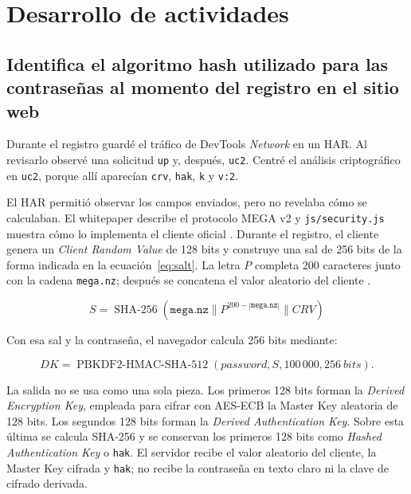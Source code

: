 \documentclass[letterpaper,12pt]{article}
\begin{document}
\section{Desarrollo de actividades}

\subsection{Identifica el algoritmo hash utilizado para las contraseñas al momento del registro en el sitio web}

Durante el registro guardé el tráfico de DevTools \textit{Network} en un HAR. Al revisarlo
observé una solicitud \texttt{up} y, después, \texttt{uc2}. Centré el análisis criptográfico
en \texttt{uc2}, porque allí aparecían \texttt{crv}, \texttt{hak}, \texttt{k} y
\texttt{v:2}.

El HAR permitió observar los campos enviados, pero no revelaba cómo se calculaban. El
whitepaper describe el protocolo MEGA v2 y \texttt{js/security.js} muestra cómo lo implementa
el cliente oficial \cite[págs.~16 a 17]{mega-whitepaper}\cite{mega-security-js}. Durante el
registro, el cliente genera un
\textit{Client Random Value} de 128 bits y construye una sal de 256 bits de la forma indicada
en la ecuación~\ref{eq:salt}. La letra \(P\) completa 200 caracteres junto con la cadena
\texttt{mega.nz}; después se concatena el valor aleatorio del cliente
\cite[págs.~16 a 17]{mega-whitepaper}.

\begin{equation}
\label{eq:salt}
S = \operatorname{SHA\mbox{-}256}
\left(\texttt{mega.nz} \parallel P^{200-|\texttt{mega.nz}|} \parallel CRV\right)
\end{equation}

Con esa sal y la contraseña, el navegador calcula 256 bits mediante:

\begin{equation}
DK = \operatorname{PBKDF2\mbox{-}HMAC\mbox{-}SHA\mbox{-}512}
(\textit{password}, S, 100\,000, 256\ \textit{bits}).
\end{equation}

La salida no se usa como una sola pieza. Los primeros 128 bits forman la
\textit{Derived Encryption Key}, empleada para cifrar con AES-ECB la Master Key aleatoria
de 128 bits. Los segundos 128 bits forman la \textit{Derived Authentication Key}. Sobre
esta última se calcula SHA-256 y se conservan los primeros 128 bits como
\textit{Hashed Authentication Key} o \texttt{hak}. El servidor recibe el valor aleatorio
del cliente, la Master Key cifrada y \texttt{hak}; no recibe la contraseña en texto claro
ni la clave de cifrado derivada.
\end{document}
